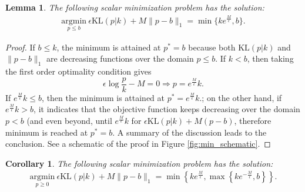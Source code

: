 \documentclass[11pt]{book}
\newtheorem{corollary}[theorem]{Corollary}
\newtheorem{lemma}[theorem]{Lemma}
\begin{document}
\begin{lemma}\label{lemma:OT_min}
The following scalar minimization problem has the solution:
\begin{align}
    \underset{p\le b}{\mathrm{argmin}}\ \epsilon\mathrm{KL}(p|k) + M \| p-b \|_1 = \min\{ ke^{\frac{M}{\epsilon}}, b \}.
\end{align}
\end{lemma}
\begin{proof}
If $b\le k$, the minimum is attained at $p^*=b$ because both $\mathrm{KL}(p|k)$ and $\|p-b\|_1$ are decreasing functions over the domain $p\le b$. If $k<b$, then taking the first order optimality condition gives 
\[
\epsilon \log \frac{p}{k} - M = 0 \Rightarrow p = e^{\frac{M}{\epsilon}}k.
\] 
If $e^{\frac{M}{\epsilon}}k \le b$, then the minimum is attained at $p^* = e^{\frac{M}{\epsilon}}k$.; on the other hand, if $e^{\frac{M}{\epsilon}}k > b$, it indicates that the objective function keeps decreasing over the domain $p<b$ (and even beyond, until $e^{\frac{M}{\epsilon}}k$ for $\epsilon\mathrm{KL}(p|k) + M (p-b)$, therefore minimum is reached at $p^* = b$. A summary of the discussion leads to the conclusion. See a schematic of the proof in Figure \ref{fig:min_schematic}.
\end{proof}


\begin{corollary}
The following scalar minimization problem has the solution:
\begin{align}
    \underset{p\ge0}{\mathrm{argmin}}\ \epsilon\mathrm{KL}(p|k) + M \| p - b \|_1 = \min \left\{ ke^{\frac{M}{\epsilon}}, \max \left\{ke^{-\frac{M}{\epsilon}}, b \right\} \right\}.
\end{align}
\end{corollary}
\end{document}
